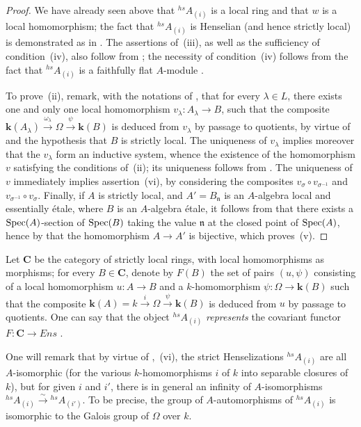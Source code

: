 \begin{proof}
We have already seen above that ${}^{hs}\!A_{(i)}$ is a local ring and that $w$ is a local homomorphism;
the fact that ${}^{hs}\!A_{(i)}$ is Henselian (and hence strictly local) is demonstrated as in .
The assertions of~(iii), as well as the sufficiency of condition~(iv), also follow from ; the necessity of condition~(iv) follows from the fact that ${}^{hs}\!A_{(i)}$ is a faithfully flat $A$-module .

To prove~(ii), remark, with the notations of , that for every $\lambda\in L$, there exists one and only one local homomorphism $v_\lambda:A_\lambda\to B$, such that the composite $\boldsymbol{k}(A_\lambda)\xrightarrow{\omega_\lambda}\Omega\xrightarrow{\psi}\boldsymbol{k}(B)$ is deduced from $v_\lambda$ by passage to quotients, by virtue of  and the hypothesis that $B$ is strictly local.
The uniqueness of $v_\lambda$ implies moreover that the $v_\lambda$ form an inductive system, whence the existence of the homomorphism $v$ satisfying the conditions of~(ii); its uniqueness follows from .
The uniqueness of $v$ immediately implies assertion~(vi), by considering the composites $v_\sigma\circ v_{\sigma^{-1}}$ and $v_{\sigma^{-1}}\circ v_\sigma$.
Finally, if $A$ is strictly local, and $A'=B_{\mathfrak{n}}$ is an $A$-algebra local and essentially \'{e}tale, where $B$ is an $A$-algebra \'{e}tale, it follows from  that there exists a $\operatorname{Spec}(A)$-section of $\operatorname{Spec}(B)$ taking the value $\mathfrak{n}$ at the closed point of $\operatorname{Spec}(A)$, hence by  that the homomorphism $A\to A'$ is bijective, which proves~(v).
\end{proof}

\begin{env}[18.8.8.1]
\label{IV.18.8.8.1}
Let $\boldsymbol{C}$ be the category of strictly local rings, with local homomorphisms as morphisms;
for every $B\in\boldsymbol{C}$, denote by $F(B)$ the set of pairs $(u,\psi)$ consisting of a local homomorphism $u:A\to B$ and a $k$-homomorphism $\psi:\Omega\to\boldsymbol{k}(B)$ such that the composite $\boldsymbol{k}(A)=k\xrightarrow{i}\Omega\xrightarrow{\psi}\boldsymbol{k}(B)$ is deduced from $u$ by passage to quotients.
One can say that the object ${}^{hs}\!A_{(i)}$ \emph{represents} the covariant functor $F:\boldsymbol C\to\boldsymbol{\mathit{Ens}}$ .

One will remark that by virtue of ,~(vi), the strict Henselizations ${}^{hs}\!A_{(i)}$ are all $A$-isomorphic (for the various $k$-homomorphisms $i$ of $k$ into separable closures of $k$), but for given $i$ and $i'$, there is in general an infinity of $A$-isomorphisms ${}^{hs}\!A_{(i)}\xrightarrow{\sim}{}^{hs}\!A_{(i')}$.
To be precise, the group of $A$-automorphisms of ${}^{hs}\!A_{(i)}$ is isomorphic to the Galois group of $\Omega$ over $k$.
\end{env}

